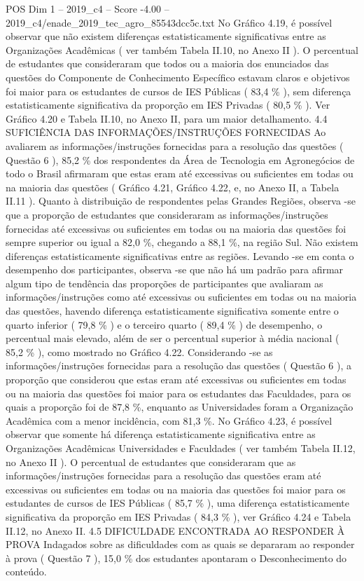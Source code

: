 \begin{textsample}{POS Dim 1 – 2019\_c4 – Score -4.00 – 2019\_c4/enade\_2019\_tec\_agro\_85543dcc5c.txt}
No Gráfico 4.19, é possível observar que não existem diferenças estatisticamente significativas entre as Organizações Acadêmicas ( ver também Tabela II.10, no Anexo II ).
O percentual de estudantes que consideraram que todos ou a maioria dos enunciados das questões do Componente de Conhecimento Específico estavam claros e objetivos foi maior para os estudantes de cursos de IES Públicas ( 83,4 \% ), sem diferença estatisticamente significativa da proporção em IES Privadas ( 80,5 \% ).
Ver Gráfico 4.20 e Tabela II.10, no Anexo II, para um maior detalhamento. 4.4 SUFICIÊNCIA DAS INFORMAÇÕES/INSTRUÇÕES FORNECIDAS Ao avaliarem as informações/instruções fornecidas para a resolução das questões ( Questão 6 ), 85,2 \% dos respondentes da Área de Tecnologia em Agronegócios de todo o Brasil afirmaram que estas eram até excessivas ou suficientes em todas ou na maioria das questões ( Gráfico 4.21, Gráfico 4.22, e, no Anexo II, a Tabela II.11 ).
Quanto à distribuição de respondentes pelas Grandes Regiões, observa -se que a proporção de estudantes que consideraram as informações/instruções fornecidas até excessivas ou suficientes em todas ou na maioria das questões foi sempre superior ou igual a 82,0 \%, chegando a 88,1 \%, na região Sul.
Não existem diferenças estatisticamente significativas entre as regiões.
Levando -se em conta o desempenho dos participantes, observa -se que não há um padrão para afirmar algum tipo de tendência das proporções de participantes que avaliaram as informações/instruções como até excessivas ou suficientes em todas ou na maioria das questões, havendo diferença estatisticamente significativa somente entre o quarto inferior ( 79,8 \% ) e o terceiro quarto ( 89,4 \% ) de desempenho, o percentual mais elevado, além de ser o percentual superior à média nacional ( 85,2 \% ), como mostrado no Gráfico 4.22.
Considerando -se as informações/instruções fornecidas para a resolução das questões ( Questão 6 ), a proporção que considerou que estas eram até excessivas ou suficientes em todas ou na maioria das questões foi maior para os estudantes das Faculdades, para os quais a proporção foi de 87,8 \%, enquanto as Universidades foram a Organização Acadêmica com a menor incidência, com 81,3 \%.
No Gráfico 4.23, é possível observar que somente há diferença estatisticamente significativa entre as Organizações Acadêmicas Universidades e Faculdades ( ver também Tabela II.12, no Anexo II ).
O percentual de estudantes que consideraram que as informações/instruções fornecidas para a resolução das questões eram até excessivas ou suficientes em todas ou na maioria das questões foi maior para os estudantes de cursos de IES Públicas ( 85,7 \% ), uma diferença estatisticamente significativa da proporção em IES Privadas ( 84,3 \% ), ver Gráfico 4.24 e Tabela II.12, no Anexo II. 4.5 DIFICULDADE ENCONTRADA AO RESPONDER À PROVA Indagados sobre as dificuldades com as quais se depararam ao responder à prova ( Questão 7 ), 15,0 \% dos estudantes apontaram o Desconhecimento do conteúdo.

\end{textsample}
